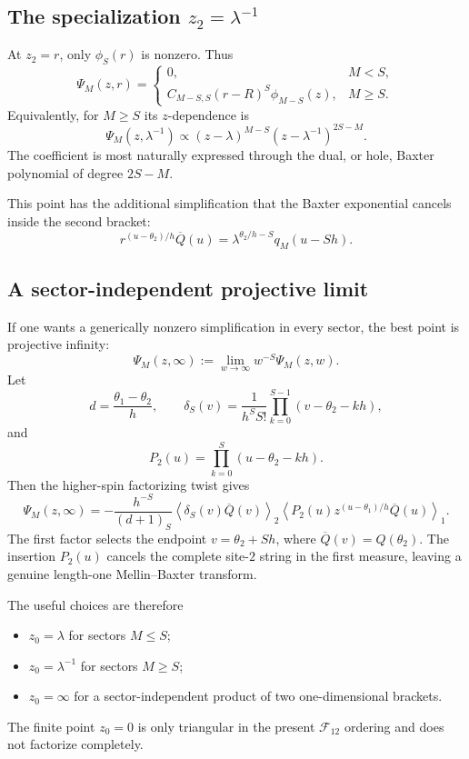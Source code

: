 \documentclass[11pt]{article}
\newcommand{\Qbar}{\overline Q}
\begin{document}
\subsection*{The specialization $z_2=\lambda^{-1}$}

At $z_2=r$, only $\phi_S(r)$ is nonzero.  Thus
\[
\boxed{
\Psi_M(z,r)
=
\begin{cases}
0,&M<S,\\[2mm]
C_{M-S,S}(r-R)^S\phi_{M-S}(z),&M\geq S.
\end{cases}}
\]
Equivalently, for $M\geq S$ its $z$-dependence is
\[
\Psi_M(z,\lambda^{-1})
\propto
(z-\lambda)^{M-S}
(z-\lambda^{-1})^{2S-M}.
\]
The coefficient is most naturally expressed through the dual, or hole,
Baxter polynomial of degree $2S-M$.

This point has the additional simplification that the Baxter exponential
cancels inside the second bracket:
\[
r^{(u-\theta_2)/h}\Qbar(u)
=
\lambda^{\theta_2/h-S}q_M(u-Sh).
\]

\subsection*{A sector-independent projective limit}

If one wants a generically nonzero simplification in every sector, the
best point is projective infinity:
\[
\Psi_M(z,\infty)
:=
\lim_{w\to\infty}w^{-S}\Psi_M(z,w).
\]
Let
\[
d=\frac{\theta_1-\theta_2}{h},
\qquad
\delta_S(v)
=
\frac{1}{h^S S!}
\prod_{k=0}^{S-1}(v-\theta_2-kh),
\]
and
\[
P_2(u)=\prod_{k=0}^{S}(u-\theta_2-kh).
\]
Then the higher-spin factorizing twist gives
\[
\boxed{
\Psi_M(z,\infty)
=
-\frac{h^{-S}}{(d+1)_S}
\left\langle\delta_S(v)\Qbar(v)\right\rangle_2
\left\langle
P_2(u)z^{(u-\theta_1)/h}\Qbar(u)
\right\rangle_1.}
\]
The first factor selects the endpoint $v=\theta_2+Sh$, where
$\Qbar(v)=Q(\theta_2)$.  The insertion $P_2(u)$ cancels the complete
site-$2$ string in the first measure, leaving a genuine length-one
Mellin--Baxter transform.

The useful choices are therefore
\begin{itemize}
\item $z_0=\lambda$ for sectors $M\leq S$;
\item $z_0=\lambda^{-1}$ for sectors $M\geq S$;
\item $z_0=\infty$ for a sector-independent product of two
      one-dimensional brackets.
\end{itemize}
The finite point $z_0=0$ is only triangular in the present
$\mathcal F_{12}$ ordering and does not factorize completely.
\end{document}
